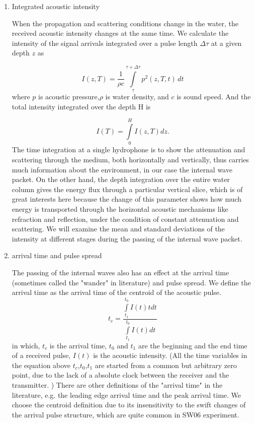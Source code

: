 \begin{enumerate}


\item Integrated acoustic intensity  

When the propagation and scattering conditions change in the water, the received acoustic intensity changes at the same time. We calculate the intensity of the signal arrivals integrated over a pulse
length $\Delta\tau$ at a given depth $z$ as

\begin{equation}\label{eq:intensity1}
I(z,T)=\displaystyle\frac{1}{{\rho}c}\int\limits^{\tau+\Delta\tau}_{\tau}p^2(z,T,t)\,dt
\end{equation}
where $p$ is acoustic
pressure,$\rho$ is water density, and $c$ is sound speed.
And the total intensity integrated over the depth H is

\begin{equation}\label{eq:intensity2}
I(T)=\displaystyle\int\limits^H_0I(z,T)dz.
\end{equation}
The time integration at a single hydrophone is to show the attenuation and scattering through the medium, both horizontally and vertically, thus carries much information about the environment, in our case the internal wave packet. On the other hand, the depth integration over the entire water column gives the energy flux through a particular vertical slice, which is of great interests here because the change of this parameter shows how much energy is transported through the horizontal acoustic mechanisms like refraction and reflection, under the condition of constant attenuation and scattering. 
We will examine the mean and standard deviations of the intensity at different stages during the passing of the internal wave packet. 

\item arrival time and pulse spread

The passing of the internal waves also has an effect at the arrival time (sometimes called the "wander" in literature) and pulse spread. We define the arrival time as the arrival time of the centroid of the acoustic pulse.
\begin{equation}\label{eq:arrival_time}
t_c =\frac {\int\limits^{t_0}_{t_1}I(t)tdt}{\int\limits^{t_0}_{t_1}I(t)dt}
\end{equation} 
in which, $t_c$ is the arrival time, $t_0$ and $t_1$ are the beginning and the end time of a received pulse, $I(t)$ is the acoustic intensity. (All the time variables in the equation above $t_c$,$t_0$,$t_1$ are started from a common but arbitrary zero point, due to the lack of a absolute clock between the receiver and the transmitter. )
There are other definitions of the "arrival time" in the literature, e.g. the leading edge arrival time and the peak arrival time. We choose the centroid definition due to its insensitivity to the swift changes of the arrival pulse structure, which are quite common in SW06 experiment. 


\end{enumerate}
